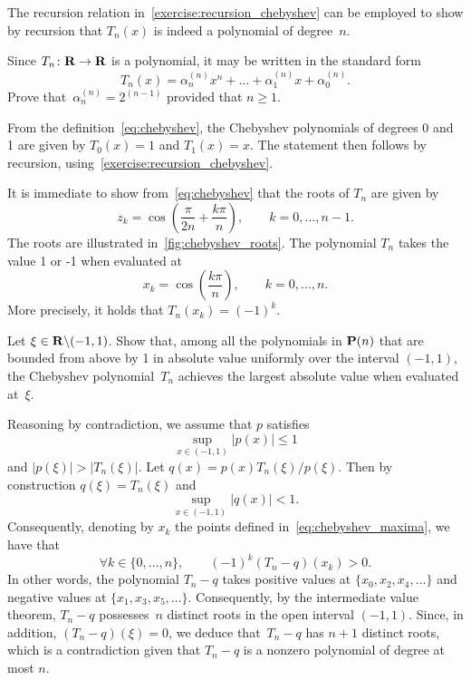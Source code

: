 \begin{remark}
    The recursion relation in~\cref{exercise:recursion_chebyshev}
    can be employed to show by recursion that $T_n(x)$ is indeed a polynomial of degree~$n$.
\end{remark}

\begin{exercise}
    \label{exercise:chebyshev_leading_coefficient}
    Since $T_n\colon \mathbf R \to \mathbf R$ is a polynomial,
    it may be written in the standard form
    \[
        T_n(x) = \alpha^{(n)}_n x^n + \dotsc + \alpha^{(n)}_1 x + \alpha^{(n)}_0.
    \]
    Prove that~$\alpha^{(n)}_n = 2^{(n-1)}$ provided that $n \geq 1$.
\end{exercise}
\begin{solution}
    From the definition~\eqref{eq:chebyshev},
    the Chebyshev polynomials of degrees 0 and 1 are given by $T_0(x) = 1$ and $T_1(x) = x$.
    The statement then follows by recursion, using~\cref{exercise:recursion_chebyshev}.
\end{solution}

It is immediate to show from~\eqref{eq:chebyshev} that the roots of $T_n$ are given by
\[
    z_k = \cos \left( \frac{\pi}{2n} + \frac{k\pi}{n} \right), \qquad k = 0, \dotsc, n-1.
\]
The roots are illustrated in~\cref{fig:chebyshev_roots}.
The polynomial $T_n$ takes the value 1 or -1 when evaluated at
\begin{equation}
    \label{eq:chebyshev_maxima}
    x_k = \cos \left( \frac{k \pi}{n} \right), \qquad k = 0, \dotsc, n.
\end{equation}
More precisely, it holds that $T_n(x_k) = (-1)^k$.

\begin{exercise}
    Let $\xi \in \mathbf R \backslash (-1, 1)$.
    Show that, among all the polynomials in $\mathbf P(n)$ that are bounded from above by 1 in absolute value uniformly over the interval $(-1, 1)$,
    the Chebyshev polynomial~$T_n$ achieves the largest absolute value when evaluated at~$\xi$.
\end{exercise}
\begin{solution}
    Reasoning by contradiction,
    we assume that $p$ satisfies
    \[
        \sup_{x \in (-1, 1)} \lvert p(x) \rvert \leq 1
    \]
    and $\lvert p(\xi) \rvert > \lvert T_n(\xi) \rvert$.
    Let $q(x) = p(x) T_n(\xi) / p(\xi)$.
    Then by construction $q(\xi) = T_n(\xi)$
    and
    \[
       \sup_{x \in (-1, 1)} \lvert q(x) \rvert < 1.
    \]
    Consequently, denoting by $x_k$ the points defined in~\eqref{eq:chebyshev_maxima},
    we have that
    \[
        \forall k \in \{0, \dotsc, n\}, \qquad
        (-1)^k (T_n - q)(x_k) > 0.
    \]
    In other words, the polynomial $T_n - q$ takes positive values at $\{x_0, x_2, x_4, \dotsc\}$ and negative values at $\{x_1, x_3, x_5, \dotsc\}$.
    Consequently, by the intermediate value theorem,
    $T_n - q$ possesses~$n$ distinct roots in the open interval $(-1, 1)$.
    Since, in addition, $(T_n - q)(\xi) = 0$,
    we deduce that~$T_n - q$ has $n+1$ distinct roots,
    which is a contradiction given that $T_n - q$ is a nonzero polynomial of degree at most $n$.
\end{solution}

